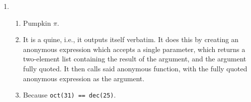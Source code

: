 \documentclass{article}
\begin{document}
\begin{enumerate}
{}

\item %

\begin{enumerate}

\item{Pumpkin $\pi$.}

\item{It is a quine, i.e., it outputs itself verbatim. It does this by creating
an anonymous expression which accepts a single parameter, which returns a
two-element list containing the result of the argument, and the argument fully
quoted. It then calls said anonymous function, with the fully quoted anonymous
expression as the argument.}

\item{Because \texttt{oct(31) == dec(25)}.}

\end{enumerate}

\end{enumerate}
\end{document}
